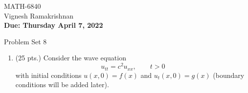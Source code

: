 \documentclass[11pt]{article}
\begin{document}
\begin{flushright}
\small{MATH-6840\\
Vignesh Ramakrishnan\\
{\bf Due: Thursday April 7, 2022}}
\end{flushright}

\begin{center}
\large{Problem Set 8}\\
\end{center}

\begin{enumerate}
  \item {\color{red}(25 pts.) Consider the wave equation }
    \[
      u_{tt}=c^2u_{xx}, \qquad t >0
    \]
     {\color{red}with initial conditions $u(x,0)=f(x)$ and $u_t(x,0)=g(x)$ (boundary conditions will be added later). }
    

\end{enumerate}
\end{document}
